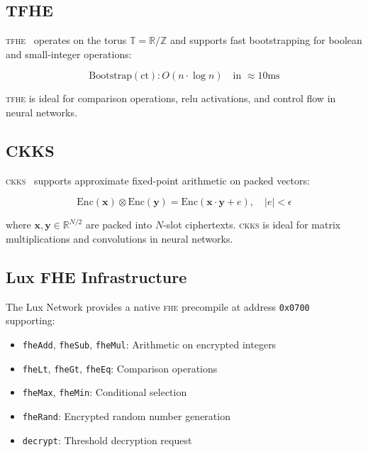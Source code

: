 \documentclass[11pt,letterpaper]{article}
\newcommand{\FHE}{\textsc{fhe}}
\newcommand{\TFHE}{\textsc{tfhe}}
\newcommand{\CKKS}{\textsc{ckks}}
\begin{document}
\subsection{TFHE}

\TFHE{}~\cite{chillotti2020tfhe} operates on the torus $\mathbb{T} = \mathbb{R}/\mathbb{Z}$ and supports fast bootstrapping for boolean and small-integer operations:

\begin{equation}
\text{Bootstrap}(\text{ct}) : O(n \cdot \log n) \quad \text{in } \approx 10\text{ms}
\end{equation}

\TFHE{} is ideal for comparison operations, relu activations, and control flow in neural networks.

\subsection{CKKS}

\CKKS{}~\cite{cheon2017ckks} supports approximate fixed-point arithmetic on packed vectors:

\begin{equation}
\text{Enc}(\mathbf{x}) \otimes \text{Enc}(\mathbf{y}) = \text{Enc}(\mathbf{x} \cdot \mathbf{y} + e), \quad |e| < \epsilon
\end{equation}

where $\mathbf{x}, \mathbf{y} \in \mathbb{R}^{N/2}$ are packed into $N$-slot ciphertexts. \CKKS{} is ideal for matrix multiplications and convolutions in neural networks.

\subsection{Lux FHE Infrastructure}

The Lux Network provides a native \FHE{} precompile at address \texttt{0x0700}~\cite{lux-tfhe,lux-fhevm} supporting:

\begin{itemize}
    \item \texttt{fheAdd}, \texttt{fheSub}, \texttt{fheMul}: Arithmetic on encrypted integers
    \item \texttt{fheLt}, \texttt{fheGt}, \texttt{fheEq}: Comparison operations
    \item \texttt{fheMax}, \texttt{fheMin}: Conditional selection
    \item \texttt{fheRand}: Encrypted random number generation
    \item \texttt{decrypt}: Threshold decryption request
\end{itemize}
\end{document}
